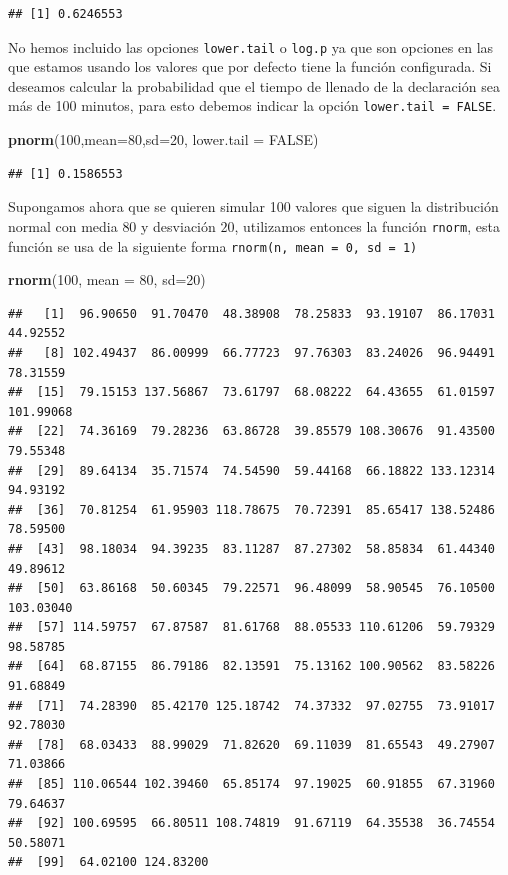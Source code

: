 \documentclass[letterpaper,]{book}
\newenvironment{Shaded}{\begin{snugshade}}{\end{snugshade}}
\newcommand{\DataTypeTok}[1]{\textcolor[rgb]{0.13,0.29,0.53}{#1}}
\newcommand{\DecValTok}[1]{\textcolor[rgb]{0.00,0.00,0.81}{#1}}
\newcommand{\KeywordTok}[1]{\textcolor[rgb]{0.13,0.29,0.53}{\textbf{#1}}}
\newcommand{\NormalTok}[1]{#1}
\newcommand{\OtherTok}[1]{\textcolor[rgb]{0.56,0.35,0.01}{#1}}
\begin{document}
\begin{verbatim}
## [1] 0.6246553
\end{verbatim}

No hemos incluido las opciones \texttt{lower.tail} o \texttt{log.p} ya que son opciones en las que estamos usando los valores que por defecto tiene la función configurada. Si deseamos calcular la probabilidad que el tiempo de llenado de la declaración sea más de 100 minutos, para esto debemos indicar la opción \texttt{lower.tail\ =\ FALSE}.

\begin{Shaded}
\begin{Highlighting}[]
\KeywordTok{pnorm}\NormalTok{(}\DecValTok{100}\NormalTok{,}\DataTypeTok{mean=}\DecValTok{80}\NormalTok{,}\DataTypeTok{sd=}\DecValTok{20}\NormalTok{, }\DataTypeTok{lower.tail =} \OtherTok{FALSE}\NormalTok{)}
\end{Highlighting}
\end{Shaded}

\begin{verbatim}
## [1] 0.1586553
\end{verbatim}

Supongamos ahora que se quieren simular 100 valores que siguen la distribución normal con media \(80\) y desviación \(20\), utilizamos entonces la función \texttt{rnorm}, esta función se usa de la siguiente forma \texttt{rnorm(n,\ mean\ =\ 0,\ sd\ =\ 1)}

\begin{Shaded}
\begin{Highlighting}[]
\KeywordTok{rnorm}\NormalTok{(}\DecValTok{100}\NormalTok{, }\DataTypeTok{mean =} \DecValTok{80}\NormalTok{, }\DataTypeTok{sd=}\DecValTok{20}\NormalTok{)}
\end{Highlighting}
\end{Shaded}

\begin{verbatim}
##   [1]  96.90650  91.70470  48.38908  78.25833  93.19107  86.17031  44.92552
##   [8] 102.49437  86.00999  66.77723  97.76303  83.24026  96.94491  78.31559
##  [15]  79.15153 137.56867  73.61797  68.08222  64.43655  61.01597 101.99068
##  [22]  74.36169  79.28236  63.86728  39.85579 108.30676  91.43500  79.55348
##  [29]  89.64134  35.71574  74.54590  59.44168  66.18822 133.12314  94.93192
##  [36]  70.81254  61.95903 118.78675  70.72391  85.65417 138.52486  78.59500
##  [43]  98.18034  94.39235  83.11287  87.27302  58.85834  61.44340  49.89612
##  [50]  63.86168  50.60345  79.22571  96.48099  58.90545  76.10500 103.03040
##  [57] 114.59757  67.87587  81.61768  88.05533 110.61206  59.79329  98.58785
##  [64]  68.87155  86.79186  82.13591  75.13162 100.90562  83.58226  91.68849
##  [71]  74.28390  85.42170 125.18742  74.37332  97.02755  73.91017  92.78030
##  [78]  68.03433  88.99029  71.82620  69.11039  81.65543  49.27907  71.03866
##  [85] 110.06544 102.39460  65.85174  97.19025  60.91855  67.31960  79.64637
##  [92] 100.69595  66.80511 108.74819  91.67119  64.35538  36.74554  50.58071
##  [99]  64.02100 124.83200
\end{verbatim}
\end{document}
